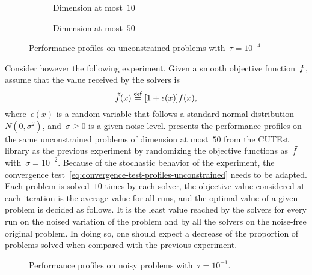 \begin{figure}[ht]
    \begin{subfigure}[b]{0.49\textwidth}
        \centering
        \caption{Dimension at most~$10$}
        \label{fig:ppu-10}
    \end{subfigure}
    \hfill
    \begin{subfigure}[b]{0.49\textwidth}
        \centering
        \caption{Dimension at most~$50$}
        \label{fig:ppu-50}
    \end{subfigure}
    \caption{Performance profiles on unconstrained problems with~$\tau = 10^{-4}$}
\end{figure}

Consider however the following experiment.
Given a smooth objective function~$f$, assume that the value received by the solvers is
\begin{equation*}
    \tilde{\obj}(\iter) \eqdef [1 + \epsilon(\iter)] \obj(\iter),
\end{equation*}
where~$\epsilon(x)$ is a random variable that follows a standard normal distribution~$N(0, \sigma^2)$, and~$\sigma \ge 0$ is a given noise level.
 presents the performance profiles on the same unconstrained problems of dimension at most~$50$ from the CUTEst library as the previous experiment by randomizing the objective functions as~$\tilde{f}$ with~$\sigma = 10^{-2}$.
Because of the stochastic behavior of the experiment, the convergence test~\cref{eq:convergence-test-profiles-unconstrained} needs to be adapted.
Each problem is solved~$10$ times by each solver, the objective value considered at each iteration is the average value for all runs, and the optimal value of a given problem is decided as follows.
It is the least value reached by the solvers for every run on the noised variation of the problem and by all the solvers on the noise-free original problem.
In doing so, one should expect a decrease of the proportion of problems solved when compared with the previous experiment.

\begin{figure}[ht]
    \centering
    \caption{Performance profiles on noisy problems with~$\tau = 10^{-1}$.}
    \label{fig:ppun-50}
\end{figure}

